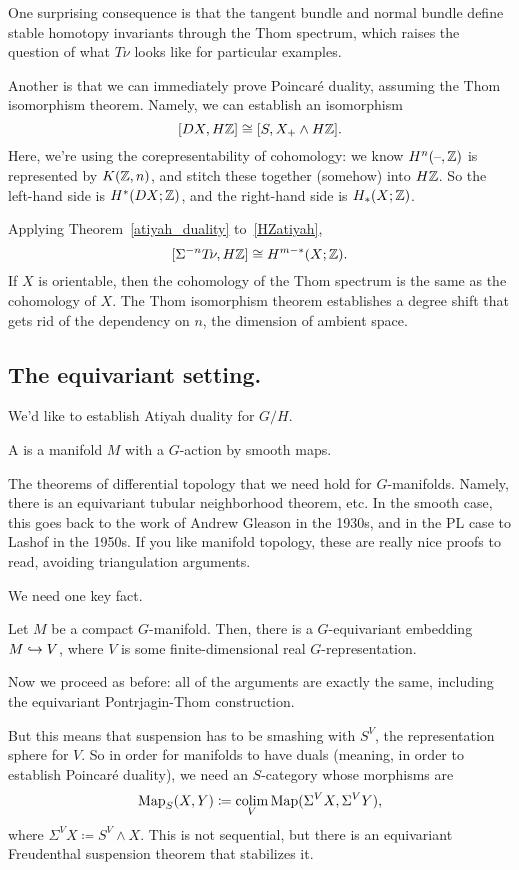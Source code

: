 One surprising consequence is that the tangent bundle and normal bundle define stable homotopy invariants through
the Thom spectrum, which raises the question of what $T\!\nu$ looks like for particular examples.

Another is that we can immediately prove Poincaré duality, assuming the Thom isomorphism theorem. Namely, we can
establish an isomorphism
\begin{equation}
\label{HZatiyah}
[DX, H\mathbb Z] \cong [S, X_+\wedge H\mathbb Z].
\end{equation}
Here, we're using the corepresentability of cohomology: we know $H^n(\text{--},\mathbb Z)$ is represented by $K(\mathbb Z, n)$, and
stitch these together (somehow) into $H\mathbb Z$. So the left-hand side is $H^*(DX;\mathbb Z)$, and the right-hand side is
$H_*(X;\mathbb Z)$.

Applying Theorem~\ref{atiyah_duality} to~\eqref{HZatiyah},
\[[\Sigma^{-n} T\!\nu, H\mathbb Z]\cong H^{m-*}(X;\mathbb Z).\]
If $X$ is orientable, then the cohomology of the Thom spectrum is the same as the cohomology of $X$. The Thom
isomorphism theorem establishes a degree shift that gets rid of the dependency on $n$, the dimension of ambient
space.
\subsection*{The equivariant setting.}
We'd like to establish Atiyah duality for $G/H$.
\begin{defn}
A  is a manifold $M$ with a $G$-action by smooth maps.
\end{defn}
The theorems of differential topology that we need hold for $G$-manifolds. Namely, there is an equivariant tubular
neighborhood theorem, etc. In the smooth case, this goes back to the work of Andrew Gleason in the 1930s, and in
the PL case to Lashof in the 1950s. If you like manifold topology, these are really nice proofs to read, avoiding
triangulation arguments.

We need one key fact.
\begin{thm}
Let $M$ be a compact $G$-manifold. Then, there is a $G$-equivariant embedding $M\hookrightarrow V$, where $V$ is some
finite-dimensional real $G$-representation.
\end{thm}
Now we proceed as before: all of the arguments are exactly the same, including the equivariant Pontrjagin-Thom
construction.

But this means that suspension has to be smashing with $S^V$, the representation sphere for $V$. So in order for
manifolds to have duals (meaning, in order to establish Poincaré duality), we need an $S$-category whose morphisms
are
\[\operatorname{Map}_S(X,Y)\coloneqq \operatorname*{colim}_V \operatorname{Map}(\Sigma^V X, \Sigma^V Y),\]
where $\Sigma^V X\coloneqq S^V\wedge X$. This is not sequential, but there is an equivariant Freudenthal suspension
theorem that stabilizes it.

